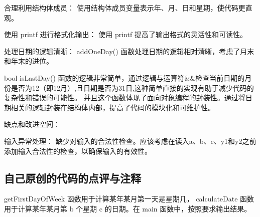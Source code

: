 合理利用结构体成员： 使用结构体成员变量表示年、月、日和星期，使代码更直观。

使用 printf 进行格式化输出： 使用 printf 提高了输出格式的灵活性和可读性。

处理日期的逻辑清晰： addOneDay() 函数处理日期的逻辑相对清晰，考虑了月末和年末的进位。

bool isLastDay() 函数的逻辑非常简单，通过逻辑与运算符$\&\&$检查当前日期的月份是否为12（即12月）,且日期是否为31日,这种简单直接的实现有助于减少代码的复杂性和错误的可能性。
并且这个函数体现了面向对象编程的封装性。通过将日期相关的逻辑封装在结构体内部，提高了代码的模块化和可维护性。

缺点和改进空间：

输入异常处理： 缺少对输入的合法性检查。应该考虑在读入a、b、c、y1和y2之前添加输入合法性的检查，以确保输入的有效性。

\subsection{自己原创的代码的点评与注释}

getFirstDayOfWeek 函数用于计算某年某月第一天是星期几， calculateDate 函数用于计算某年某月第 b 个星期 c 的日期。在 main 函数中，按照要求输出结果。

